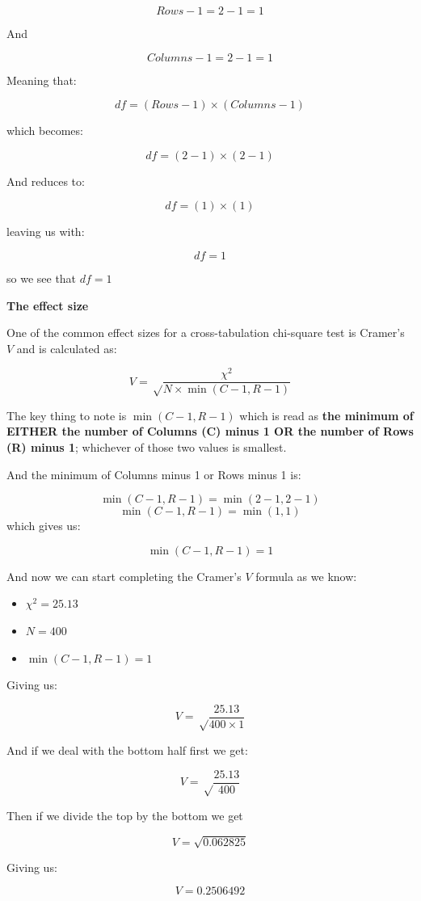 \documentclass[
  oneside]{book}
\providecommand{\tightlist}{%
  \setlength{\itemsep}{0pt}\setlength{\parskip}{0pt}}
\begin{document}
\[Rows - 1 = 2 - 1 = 1\]

And

\[Columns - 1 = 2 - 1 = 1\]

Meaning that:

\[df = (Rows - 1) \times (Columns - 1)\]

which becomes:

\[df = (2 - 1) \times (2 - 1)\]

And reduces to:

\[df = (1) \times (1)\]

leaving us with:

\[df = 1\]

so we see that \(df = 1\)

\textbf{The effect size}

One of the common effect sizes for a cross-tabulation chi-square test is Cramer's \(V\) and is calculated as:

\[V = \sqrt\frac{\chi^2}{N \times \min(C-1, R-1)}\]

The key thing to note is \(\min(C-1, R-1)\) which is read as \textbf{the minimum of EITHER the number of Columns (C) minus 1 OR the number of Rows (R) minus 1}; whichever of those two values is smallest.

And the minimum of Columns minus 1 or Rows minus 1 is:

\[\min(C-1, R-1) = \min( 2 - 1,  2 - 1)\]
\[\min(C-1, R-1) = \min( 1,  1)\]
which gives us:

\[\min(C-1, R-1) = 1\]

And now we can start completing the Cramer's \(V\) formula as we know:

\begin{itemize}
\tightlist
\item
  \(\chi^2 = 25.13\)
\item
  \(N = 400\)
\item
  \(\min(C-1, R-1) = 1\)
\end{itemize}

Giving us:

\[V = \sqrt\frac{25.13}{400 \times 1}\]

And if we deal with the bottom half first we get:

\[V = \sqrt\frac{25.13}{400}\]

Then if we divide the top by the bottom we get

\[V = \sqrt{0.062825}\]

Giving us:

\[V = 0.2506492\]
\end{document}
